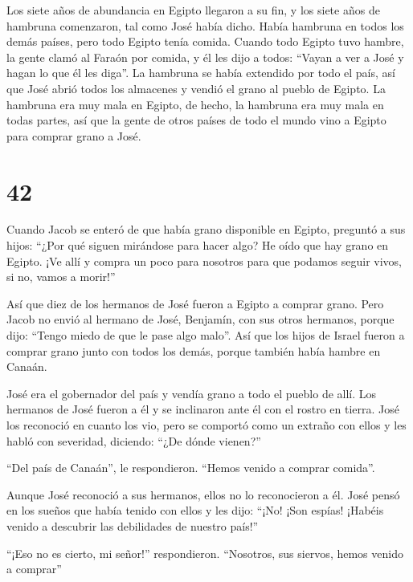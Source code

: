  Los siete años de abundancia en Egipto llegaron a su fin,
 y los siete años de hambruna comenzaron, tal como José
había dicho. Había hambruna en todos los demás países, pero todo Egipto
tenía comida.  Cuando todo Egipto tuvo hambre, la gente
clamó al Faraón por comida, y él les dijo a todos: ``Vayan a ver a José
y hagan lo que él les diga''.  La hambruna se había
extendido por todo el país, así que José abrió todos los almacenes y
vendió el grano al pueblo de Egipto. La hambruna era muy mala en Egipto,
 de hecho, la hambruna era muy mala en todas partes, así
que la gente de otros países de todo el mundo vino a Egipto para comprar
grano a José.

\hypertarget{section-41}{%
\section{42}\label{section-41}}

 Cuando Jacob se enteró de que había grano disponible en
Egipto, preguntó a sus hijos: ``¿Por qué siguen mirándose para hacer
algo?  He oído que hay grano en Egipto. ¡Ve allí y compra un
poco para nosotros para que podamos seguir vivos, si no, vamos a
morir!''

 Así que diez de los hermanos de José fueron a Egipto a
comprar grano.  Pero Jacob no envió al hermano de José,
Benjamín, con sus otros hermanos, porque dijo: ``Tengo miedo de que le
pase algo malo''.  Así que los hijos de Israel fueron a
comprar grano junto con todos los demás, porque también había hambre en
Canaán.

 José era el gobernador del país y vendía grano a todo el
pueblo de allí. Los hermanos de José fueron a él y se inclinaron ante él
con el rostro en tierra.  José los reconoció en cuanto los
vio, pero se comportó como un extraño con ellos y les habló con
severidad, diciendo: ``¿De dónde vienen?''

``Del país de Canaán'', le respondieron. ``Hemos venido a comprar
comida''.

 Aunque José reconoció a sus hermanos, ellos no lo
reconocieron a él.  José pensó en los sueños que había
tenido con ellos y les dijo: ``¡No! ¡Son espías! ¡Habéis venido a
descubrir las debilidades de nuestro país!''

 ``¡Eso no es cierto, mi señor!'' respondieron. ``Nosotros,
sus siervos, hemos venido a comprar''

